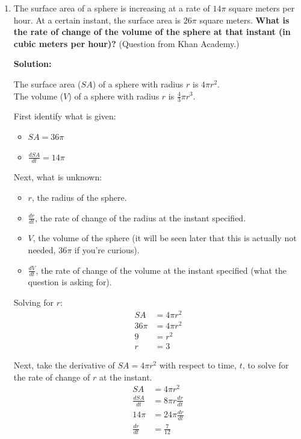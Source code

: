 \documentclass[12pt]{article}
\begin{document}
\begin{enumerate}
    \item The surface area of a sphere is increasing at a rate of $14 \pi$ square meters per hour. At a certain instant, the surface area is $26 \pi$ square meters. \textbf{What is the rate of change of the volume of the sphere at that instant (in cubic meters per hour)?} (Question from Khan Academy.)

          \noindent \textbf{Solution:}

          \noindent The surface area ($SA$) of a sphere with radius $r$ is $4 \pi r^2$.
          \\ The volume ($V$) of a sphere with radius $r$ is $\frac{4}{3} \pi r^3$.

          \noindent First identify what is given:
          \begin{itemize}
              \item $SA = 36 \pi$
              \item $\frac{dSA}{dt} = 14 \pi$
          \end{itemize}

          \noindent Next, what is unknown:
          \begin{itemize}
              \item $r$, the radius of the sphere.
              \item $\frac{dr}{dt}$, the rate of change of the radius at the instant specified.
              \item $V$, the volume of the sphere (it will be seen later that this is actually not needed, $36 \pi$ if you're curious).
              \item $\frac{dV}{dt}$, the rate of change of the volume at the instant specified (what the question is asking for).
          \end{itemize}

          \noindent Solving for $r$:
          \begin{align*}
              SA     & = 4 \pi r^2 \\
              36 \pi & = 4 \pi r^2 \\
              9      & = r^2       \\
              r      & = 3
          \end{align*}

          \noindent Next, take the derivative of $SA = 4 \pi r^2$ with respect to time, $t$, to solve for the rate of change of $r$ at the instant.
          \begin{align*}
              SA             & = 4 \pi r^2             \\
              \frac{dSA}{dt} & = 8 \pi r \frac{dr}{dt} \\[6pt]
              14 \pi         & = 24 \pi \frac{dr}{dt}  \\[6pt]
              \frac{dr}{dt}  & = \frac{7}{12}
          \end{align*}


\end{enumerate}
\end{document}
